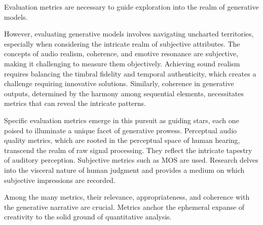 Evaluation metrics are necessary to guide exploration into the realm of generative models.

However, evaluating generative models involves navigating uncharted territories, especially when considering the intricate realm of subjective attributes. The concepts of audio realism, coherence, and emotive resonance are subjective, making it challenging to measure them objectively. Achieving sound realism requires balancing the timbral fidelity and temporal authenticity, which creates a challenge requiring innovative solutions. Similarly, coherence in generative outputs, determined by the harmony among sequential elements, necessitates metrics that can reveal the intricate patterns.

Specific evaluation metrics emerge in this pursuit as guiding stars, each one poised to illuminate a unique facet of generative prowess. Perceptual audio quality metrics, which are rooted in the perceptual space of human hearing, transcend the realm of raw signal processing. They reflect the intricate tapestry of auditory perception. Subjective metrics such as \ac{MOS} are used. Research delves into the visceral nature of human judgment and provides a medium on which subjective impressions are recorded.

Among the many metrics, their relevance, appropriateness, and coherence with the generative narrative are crucial. Metrics anchor the ephemeral expanse of creativity to the solid ground of quantitative analysis.